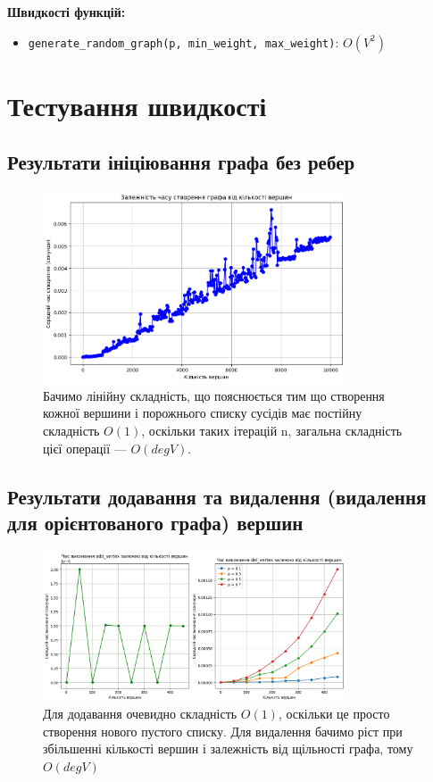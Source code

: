 \documentclass{article}
\begin{document}
\textbf{Швидкості функцій:}
\begin{itemize}
    \item \texttt{generate\_random\_graph(p, min\_weight, max\_weight)}: $O(V^2)$
\end{itemize}
\section{Тестування швидкості}
\subsection{Результати ініціювання графа без ребер}

\begin{figure}[h!]
\centering
\includegraphics[width=0.8\textwidth]{img/init.png}
\caption{Бачимо лінійну складність, що пояснюється тим що створення кожної вершини і порожнього списку сусідів має постійну складність $O(1)$, оскільки таких ітерацій n, загальна складність цієї операції — $O(deg V)$.}
\label{fig:init}
\end{figure}

\subsection{Результати додавання та видалення (видалення для орієнтованого графа) вершин}

\begin{figure}[h!]
\centering
\includegraphics[width=0.8\textwidth]{img/vertex.png}
\caption{Для додавання очевидно складність $O(1)$, оскільки це просто створення нового пустого списку. Для видалення бачимо ріст при збільшенні кількості вершин і залежність від щільності графа, тому $O(deg V)$}
\label{fig:add, del vertexes}
\end{figure}
\end{document}

